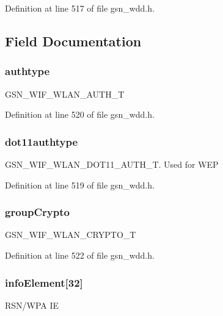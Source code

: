 Definition at line 517 of file gsn\_\-wdd.h.



\subsection{Field Documentation}
\hypertarget{a00292_a9e91fd4de1668c3ea9ad4281963d2e7b}{
\subsubsection[{authtype}]{ {\bf authtype}}}
\label{a00292_a9e91fd4de1668c3ea9ad4281963d2e7b}
GSN\_\-WIF\_\-WLAN\_\-AUTH\_\-T 

Definition at line 520 of file gsn\_\-wdd.h.

\hypertarget{a00292_aae6f1d203042b11df814ffc52e3bb9df}{
\subsubsection[{dot11authtype}]{ {\bf dot11authtype}}}
\label{a00292_aae6f1d203042b11df814ffc52e3bb9df}
GSN\_\-WIF\_\-WLAN\_\-DOT11\_\-AUTH\_\-T. Used for WEP 

Definition at line 519 of file gsn\_\-wdd.h.

\hypertarget{a00292_ada57203c7d5f11c7d66faf0a7d619b99}{
\subsubsection[{groupCrypto}]{ {\bf groupCrypto}}}
\label{a00292_ada57203c7d5f11c7d66faf0a7d619b99}
GSN\_\-WIF\_\-WLAN\_\-CRYPTO\_\-T 

Definition at line 522 of file gsn\_\-wdd.h.

\hypertarget{a00292_ac51b90843d296d1e4c5f5145473b6be2}{
\subsubsection[{infoElement}]{ {\bf infoElement}\mbox{[}32\mbox{]}}}
\label{a00292_ac51b90843d296d1e4c5f5145473b6be2}
RSN/WPA IE 

